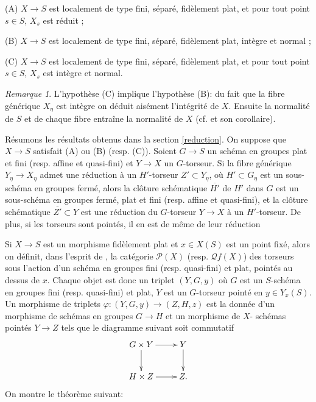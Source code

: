 \documentclass[11pt]{amsart}
\numberwithin{equation}{section}
\theoremstyle{definition}
\theoremstyle{remark}
\newtheorem{rem}[thm]{Remarque}
\begin{document}
(A) $X\to S$ est localement de type fini, s\'epar\'e, fid\`element plat, et pour tout point $s\in S$, $X_s$ est r\'eduit ;
\smallskip

(B) $X\to S$ est localement de type fini, s\'epar\'e, fid\`element plat, int\`egre et normal ;
\smallskip


(C) $X\to S$ est localement de type fini, s\'epar\'e, fid\`element plat, et pour tout point $s\in S$, $X_s$ est int\`egre et normal.
\medskip

\begin{rem}\label{remNorma} L'hypoth\`ese (C) implique l'hypoth\`ese (B): du fait que la fibre g\'en\'erique $X_{\eta}$ est int\`egre on d\'eduit ais\'ement l'int\'egrit\'e de $X$. Ensuite la normalit\'e de $S$ et de chaque fibre entra\^ine la normalit\'e de $X$ (cf. \cite[Theorem 23.9]{Mat} et son corollaire).
\end{rem}
\medskip

R\'esumons les r\'esultats obtenus dans la section \ref{reduction}. On suppose que $X \to S$ satisfait (A) ou (B) (resp. (C)). Soient $G \to S$ un sch\'ema en groupes plat et fini (resp. affine et quasi-fini) et $Y \to X$ un $G$-torseur. Si la fibre g\'en\'erique $Y_\eta \to X_\eta $ admet une r\'eduction \`a un $H'$-torseur $Z' \subset Y_\eta $, o\`u $H' \subset G_\eta $ est un sous-sch\'ema en groupes ferm\'e, alors la cl\^oture sch\'ematique $\overline {H'} $ de $H' $ dans $G$ est un sous-sch\'ema en groupes ferm\'e, plat et fini (resp. affine et quasi-fini), et la cl\^oture sch\'ematique $\overline {Z'} \subset Y$ est une r\'eduction du $G$-torseur $Y \to X$ \`a un $H'$-torseur. De plus, si les torseurs sont point\'es, il en est de m\^eme de leur r\'eduction

\medskip


Si $X\to S$ est un morphisme fid\`element plat et $x\in X(S)$ est un point fix\'e, alors on d\'efinit, dans l'esprit de \cite{GAS},
la cat\'egorie  $\mathcal{P}(X)$ (resp. $\mathcal{Q}f(X)$)  des torseurs sous l'action d'un sch\'ema en groupes fini (resp. quasi-fini) et plat,
point\'es au dessus de $x$. Chaque objet est donc un triplet $(Y,G,y)$ o\`u $G$ est un $S$-sch\'ema en groupes fini (resp. quasi-fini) et plat,
$Y$ est un $G$-torseur point\'e en $y\in Y_x(S)$.  Un morphisme de triplets $\varphi: (Y,G,y)\to (Z,H, z)$ est la donn\'ee d'un morphisme de sch\'emas en groupes $G\to H$ et un morphisme de $X$- sch\'emas point\'es $Y\to Z$ tels que le diagramme suivant soit commutatif
$$\xymatrix{G\times Y\ar[d]\ar[r]&Y\ar[d]\\
H\times Z\ar[r] & Z.}$$
On montre le th\'eor\`eme suivant:
\end{document}
